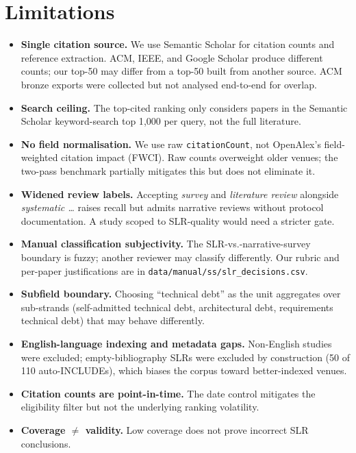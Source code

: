 \documentclass[conference]{IEEEtran}
\begin{document}
\section{Limitations}
\label{sec:limitations}

\begin{itemize}
  \item \textbf{Single citation source.} We use Semantic Scholar for
        citation counts and reference extraction. ACM, IEEE, and Google
        Scholar produce different counts; our top-50 may differ from a
        top-50 built from another source. ACM bronze exports were
        collected but not analysed end-to-end for overlap.
  \item \textbf{Search ceiling.} The top-cited ranking only considers
        papers in the Semantic Scholar keyword-search top 1{,}000 per
        query, not the full literature.
  \item \textbf{No field normalisation.} We use raw \texttt{citationCount},
        not OpenAlex's field-weighted citation impact (FWCI). Raw counts
        overweight older venues; the two-pass benchmark partially
        mitigates this but does not eliminate it.
  \item \textbf{Widened review labels.} Accepting \emph{survey} and
        \emph{literature review} alongside \emph{systematic \ldots} raises
        recall but admits narrative reviews without protocol documentation.
        A study scoped to SLR-quality would need a stricter gate.
  \item \textbf{Manual classification subjectivity.} The SLR-vs.-narrative-survey
        boundary is fuzzy; another reviewer may classify differently. Our
        rubric and per-paper justifications are in
        \texttt{data/manual/ss/slr\_decisions.csv}.
  \item \textbf{Subfield boundary.} Choosing ``technical debt'' as the unit
        aggregates over sub-strands (self-admitted technical debt,
        architectural debt, requirements technical debt) that may behave
        differently.
  \item \textbf{English-language indexing and metadata gaps.} Non-English
        studies were excluded; empty-bibliography SLRs were excluded by
        construction (50 of 110 auto-INCLUDEs), which biases the corpus
        toward better-indexed venues.
  \item \textbf{Citation counts are point-in-time.} The date control
        mitigates the eligibility filter but not the underlying ranking
        volatility.
  \item \textbf{Coverage $\neq$ validity.} Low coverage does not prove
        incorrect SLR conclusions.
\end{itemize}
\end{document}
